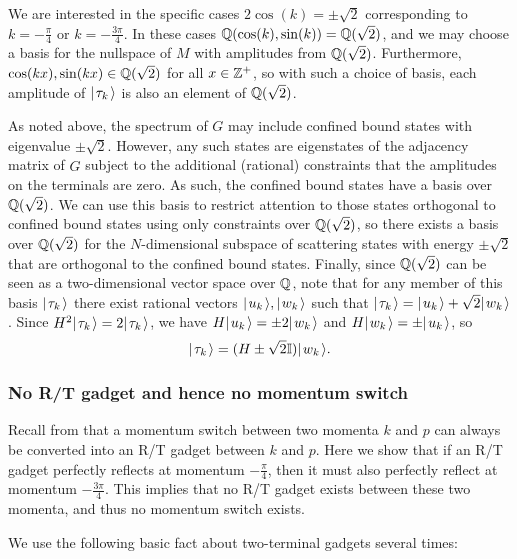 \documentclass[../thesis-main/thesis-main]{subfiles}
\begin{document}
We are interested in the specific cases $2\cos(k)=\pm\sqrt{2}$ corresponding to $k = -\frac{\pi}{4}$ or $k = -\frac{3\pi}{4}$.  In these cases $\mathbb{Q}(\cos(k),\sin(k)) = \mathbb{Q}(\sqrt{2})$, and we may choose a basis for the nullspace of $M$ with amplitudes from $\mathbb{Q}(\sqrt{2})$. Furthermore, $\cos(kx), \sin(kx) \in \mathbb{Q}(\sqrt{2})$ for all $x\in \mathbb{Z}^+$, so with such a choice of basis, each amplitude of $|\mspace{2mu} \tau_k \mspace{2mu} \rangle$ is also an element of $\mathbb{Q}(\sqrt{2})$.

As noted above, the spectrum of $G$ may include confined bound states \cite{CG12} with eigenvalue $\pm\sqrt2$.  However, any such states are eigenstates of the adjacency matrix of $\hat{G}$ subject to the additional (rational) constraints that the amplitudes on the terminals are zero.  As such, the confined bound states have a basis over $\mathbb{Q}(\sqrt{2})$. We can use this basis to restrict attention to those states orthogonal to confined bound states using only constraints over $\mathbb{Q}(\sqrt{2})$, so there exists a basis over $\mathbb{Q}(\sqrt{2})$ for the $N$-dimensional subspace of scattering states with energy $\pm\sqrt{2}$ that are orthogonal to the confined bound states. Finally, since $\mathbb{Q}(\sqrt{2})$ can be seen as a two-dimensional vector space over $\mathbb{Q}$, note that for any member of this basis $|\mspace{2mu} \tau_k \mspace{2mu} \rangle$ there exist rational vectors $|\mspace{2mu} u_k \mspace{2mu} \rangle,|\mspace{2mu} w_k \mspace{2mu} \rangle$ such that $|\mspace{2mu} \tau_k \mspace{2mu} \rangle=|\mspace{2mu} u_k \mspace{2mu} \rangle + \sqrt{2}|\mspace{2mu} w_k \mspace{2mu} \rangle$. Since $H^2|\mspace{2mu} \tau_k \mspace{2mu} \rangle=2|\mspace{2mu} \tau_k \mspace{2mu} \rangle$, we have $H|\mspace{2mu} u_k \mspace{2mu} \rangle=\pm 2|\mspace{2mu} w_k \mspace{2mu} \rangle$ and $H|\mspace{2mu} w_k \mspace{2mu} \rangle = \pm |\mspace{2mu} u_k \mspace{2mu} \rangle$, so
\begin{equation}
  |\mspace{2mu} \tau_k \mspace{2mu} \rangle=(H \pm \sqrt{2} \mathbb{I})|\mspace{2mu} w_k \mspace{2mu} \rangle.\label{eq:form_of_tau}
\end{equation}

\subsubsection{No R/T gadget and hence no momentum switch}

Recall from  that a momentum switch between two momenta $k$ and $p$ can always be converted into an R/T gadget between $k$ and $p$. Here we show that if an R/T gadget perfectly reflects at momentum $-\frac{\pi}{4}$, then it must also perfectly reflect at momentum $-\frac{3\pi}{4}$. This implies that no R/T gadget exists between these two momenta, and thus no momentum switch exists.

We use the following basic fact about two-terminal gadgets several times: 
\end{document}
